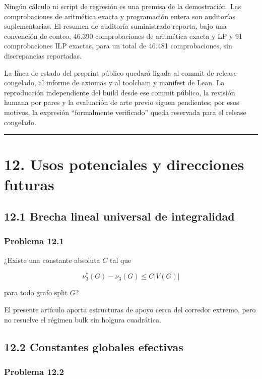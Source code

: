 \documentclass[
  11pt,
]{article}
\begin{document}
Ningún cálculo ni script de regresión es una premisa de la demostración. Las comprobaciones de aritmética exacta y programación entera son auditorías suplementarias. El resumen de auditoría suministrado reporta, bajo una convención de conteo, 46.390 comprobaciones de aritmética exacta y LP y 91 comprobaciones ILP exactas, para un total de 46.481 comprobaciones, sin discrepancias reportadas.

La línea de estado del preprint público quedará ligada al commit de release congelado, al informe de axiomas y al toolchain y manifest de Lean. La reproducción independiente del build desde ese commit público, la revisión humana por pares y la evaluación de arte previo siguen pendientes; por esos motivos, la expresión ``formalmente verificado'' queda reservada para el release congelado.

\begin{center}\rule{0.5\linewidth}{0.5pt}\end{center}

\section{12. Usos potenciales y direcciones futuras}\label{usos-potenciales-y-direcciones-futuras}

\subsection{12.1 Brecha lineal universal de integralidad}\label{brecha-lineal-universal-de-integralidad}

\subsubsection{Problema 12.1}\label{problema-12.1}

¿Existe una constante absoluta \(C\) tal que

\[
\nu_3^*(G)-\nu_3(G)
\le C|V(G)|
\]

para todo grafo split \(G\)?

El presente artículo aporta estructuras de apoyo cerca del corredor extremo, pero no resuelve el régimen bulk sin holgura cuadrática.

\subsection{12.2 Constantes globales efectivas}\label{constantes-globales-efectivas}

\subsubsection{Problema 12.2}\label{problema-12.2}
\end{document}
